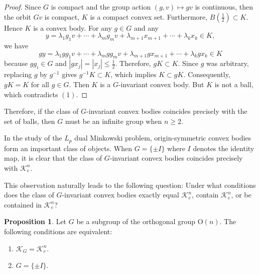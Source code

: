 \documentclass[12pt, reqno]{amsart}
\theoremstyle{definition}
\newtheorem{proposition}[theorem]{Proposition}
\theoremstyle{remark}
\numberwithin{equation}{section}
\newcommand{\On}{\mathrm{O}(n)}
\newcommand{\KG}{\mathcal{K}_{G}}
\begin{document}
\begin{proof}
		Since $G$ is compact and the group action $(g,v) \mapsto gv$ is continuous, then
		the orbit $Gv$ is compact, $K$ is a compact convex set. Furthermore,  $B(\frac{1}{2})\subset K$. Hence $K$ is a convex body. For any $g\in G$ and any $$y=\lambda_{1}g_{1}v+\cdots+\lambda_{m}g_{m}v+\lambda_{m+1}x_{m+1}+\cdots+\lambda_{k}x_{k} \in K,$$
		we have
		 $$gy=\lambda_{1}gg_{1}v+\cdots+\lambda_{m}gg_{m}v+\lambda_{m+1}gx_{m+1}+\cdots+\lambda_{k}gx_{k} \in K$$
		 because $gg_{i}\in G$ and $|gx_{j}|=|x_{j}|\le\frac{1}{2}$. Therefore, $gK \subset K$. Since $g$ was arbitrary, replacing $g$ by $g^{-1}$ gives $g^{-1}K \subset K$, which implies $K \subset gK$. Consequently, $gK = K$ for all $g \in G$. Then $K$ is a \( G \)-invariant convex body. But $K$ is not a ball, which contradicts $(1)$.
		 
		
	\end{proof}
	
	Therefore, if the class of $G$-invariant convex bodies coincides precisely with the set of balls, then $G$ must  be an infinite group when $n\ge 2$.
	
	
	In the study of the $L_{p}$ dual Minkowski problem, origin-symmetric convex bodies form an important class of objects. When $G = \{\pm I\}$ where $I$ denotes the identity map, it is clear that the class of $G$-invariant convex bodies coincides precisely with $\mathcal{K}_e^n$.
	
	This observation naturally leads to the following question: Under what conditions does the class of $G$-invariant convex bodies exactly equal $\mathcal{K}_e^n$, contain $\mathcal{K}_e^n$, or be contained in $\mathcal{K}_e^n$?
	
	
	
	\begin{proposition}\label{G=osym}
		Let $G$ be a subgroup of the orthogonal group $\On$. 
		The following conditions are equivalent:
		\begin{enumerate}
			\item $\KG=\mathcal{K}_{e}^{n}$.
			\item $G = \{\pm I\}$.
		\end{enumerate}
	\end{proposition}
	
\end{document}
